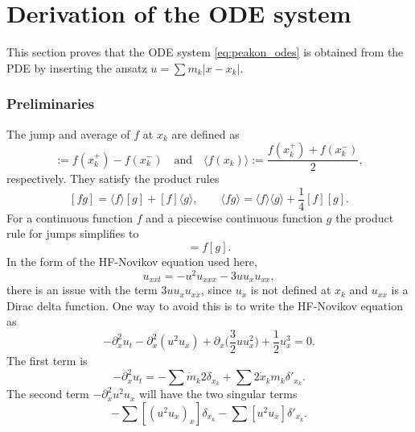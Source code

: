 \documentclass[english,master]{liumaiex}
\theoremstyle{thesisplain}
\theoremstyle{thesisdefinition}
\numberwithin{equation}{section}
\begin{document}
\section{Derivation of the ODE system} \label{sec:DerivationODE}

This section proves that the ODE system \eqref{eq:peakon_odes} is obtained from the PDE by inserting the ansatz $u = \sum m_k |x - x_k|$.

\subsubsection*{Preliminaries}

The jump and average of $f$ at $x_k$ are defined as
\begin{equation}
	[f(x_k)] := f(x_k^+) - f(x_k^-) \quad \text{and} \quad \langle f(x_k)\rangle := \frac{f(x_k^+) + f(x_k^-)}{2},
\end{equation}
respectively. They satisfy the product rules
\begin{equation} \label{eq:dirac_product_rules}
	[fg] = \langle f\rangle[g] + [f]\langle g\rangle, \quad \quad \langle fg\rangle = \langle f\rangle\langle g\rangle + \frac{1}{4}[f][g].
\end{equation}
%
For a continuous function $f$ and a piecewise continuous function $g$ the product rule for jumps simplifies to
\begin{equation}
	[fg] = f[g].
\end{equation}
In the form of the HF-Novikov equation used here,
\begin{equation}
	u_{xxt} = -u^2u_{xxx} - 3uu_xu_{xx},
\end{equation}
there is an issue with the term $3uu_xu_{xx}$, since $u_x$ is not defined at $x_k$ and $u_{xx}$ is a Dirac delta function. One way to avoid this is to write the HF-Novikov equation as
\begin{equation}
	-\partial_x^2 u_t - \partial_x^2 (u^2 u_x) + \partial_x \Big(\frac{3}{2} u u_x^2 \Big) + \frac{1}{2}u_x^3 = 0.
\end{equation}
%
The first term is 
\begin{equation}
	-\partial_x^2 u_t = - \sum \dot{m}_k 2 \delta_{x_k} + \sum 2 \dot{x}_k m_k \delta'_{x_k}.
\end{equation}
%
The second term $-\partial_x^2 u^2 u_x$ will have the two singular terms
\begin{equation}
	- \sum [(u^2 u_x)_x] \delta_{x_k} - \sum [u^2 u_x] \delta'_{x_k}.
\end{equation}
\end{document}

